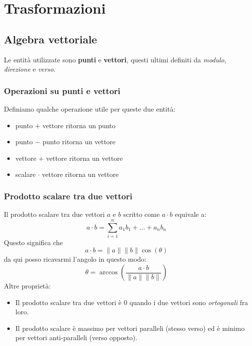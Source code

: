 \chapter{Trasformazioni}
\section{Algebra vettoriale}
Le entit\`a utilizzate sono \textbf{punti} e \textbf{vettori}, questi ultimi definiti da
\emph{modulo}, \emph{direzione} e \emph{verso}.

\subsection{Operazioni su punti e vettori}
Definiamo qualche operazione utile per queste due entit\`a:
\begin{itemize}
	\item punto $+$ vettore ritorna un punto
	\item punto $-$ punto ritorna un vettore
	\item vettore $+$ vettore ritorna un vettore
	\item scalare $\cdot$ vettore ritorna un vettore
\end{itemize}

\subsection{Prodotto scalare tra due vettori}
Il prodotto scalare tra due vettori $a$ e $b$ scritto come $a \cdot b$ equivale a:
\[ a \cdot b = \sum_{i=1}^n a_1 b_1 + \dots + a_n b_n  \]
Questo significa che
\[ a \cdot b = \| a \| \| b \| \cos{(\theta)} \]
da qui posso ricavarmi l'angolo in questo modo:
\[ \theta = \arccos{\left( \frac{a \cdot b}{\| a \| \| b \|} \right)} \]
Altre propriet\`a:
\begin{itemize}
	\item Il prodotto scalare tra due vettori \`e 0 quando i due vettori sono \emph{ortogonali}
	      fra loro.
	\item Il prodotto scalare \`e massimo per vettori paralleli (stesso verso) ed \`e minimo
	      per vettori anti-paralleli (verso opposto).
\end{itemize}

